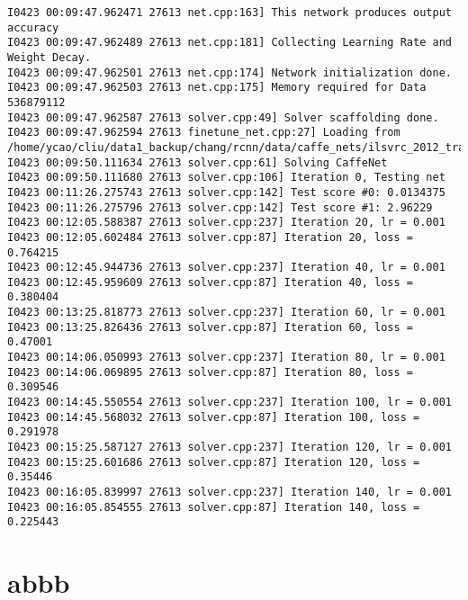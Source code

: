 \documentclass[a4]{article}
\begin{document}
\begin{lstlisting}
I0423 00:09:47.962471 27613 net.cpp:163] This network produces output accuracy
I0423 00:09:47.962489 27613 net.cpp:181] Collecting Learning Rate and Weight Decay.
I0423 00:09:47.962501 27613 net.cpp:174] Network initialization done.
I0423 00:09:47.962503 27613 net.cpp:175] Memory required for Data 536879112
I0423 00:09:47.962587 27613 solver.cpp:49] Solver scaffolding done.
I0423 00:09:47.962594 27613 finetune_net.cpp:27] Loading from /home/ycao/cliu/data1_backup/chang/rcnn/data/caffe_nets/ilsvrc_2012_train_iter_310k
I0423 00:09:50.111634 27613 solver.cpp:61] Solving CaffeNet
I0423 00:09:50.111680 27613 solver.cpp:106] Iteration 0, Testing net
I0423 00:11:26.275743 27613 solver.cpp:142] Test score #0: 0.0134375
I0423 00:11:26.275796 27613 solver.cpp:142] Test score #1: 2.96229
I0423 00:12:05.588387 27613 solver.cpp:237] Iteration 20, lr = 0.001
I0423 00:12:05.602484 27613 solver.cpp:87] Iteration 20, loss = 0.764215
I0423 00:12:45.944736 27613 solver.cpp:237] Iteration 40, lr = 0.001
I0423 00:12:45.959609 27613 solver.cpp:87] Iteration 40, loss = 0.380404
I0423 00:13:25.818773 27613 solver.cpp:237] Iteration 60, lr = 0.001
I0423 00:13:25.826436 27613 solver.cpp:87] Iteration 60, loss = 0.47001
I0423 00:14:06.050993 27613 solver.cpp:237] Iteration 80, lr = 0.001
I0423 00:14:06.069895 27613 solver.cpp:87] Iteration 80, loss = 0.309546
I0423 00:14:45.550554 27613 solver.cpp:237] Iteration 100, lr = 0.001
I0423 00:14:45.568032 27613 solver.cpp:87] Iteration 100, loss = 0.291978
I0423 00:15:25.587127 27613 solver.cpp:237] Iteration 120, lr = 0.001
I0423 00:15:25.601686 27613 solver.cpp:87] Iteration 120, loss = 0.35446
I0423 00:16:05.839997 27613 solver.cpp:237] Iteration 140, lr = 0.001
I0423 00:16:05.854555 27613 solver.cpp:87] Iteration 140, loss = 0.225443

\end{lstlisting}

\section{abbb}
\end{document}
